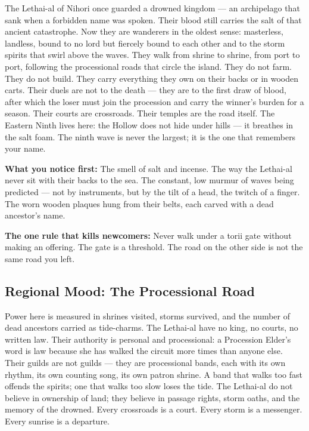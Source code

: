 \vspace{2mm}
\begin{tcolorbox}[colback=black!3,colframe=blue!60!black,title={Theme \& Atmosphere},breakable]
The Lethai-al of Nihori once guarded a drowned kingdom --- an archipelago that sank when a forbidden name was spoken. Their blood still carries the salt of that ancient catastrophe. Now they are wanderers in the oldest sense: masterless, landless, bound to no lord but fiercely bound to each other and to the storm spirits that swirl above the waves. They walk from shrine to shrine, from port to port, following the processional roads that circle the island. They do not farm. They do not build. They carry everything they own on their backs or in wooden carts. Their duels are not to the death --- they are to the first draw of blood, after which the loser must join the procession and carry the winner's burden for a season. Their courts are crossroads. Their temples are the road itself. The Eastern Ninth lives here: the Hollow does not hide under hills --- it breathes in the salt foam. The ninth wave is never the largest; it is the one that remembers your name.

\vspace{2mm}
\textbf{What you notice first:} The smell of salt and incense. The way the Lethai-al never sit with their backs to the sea. The constant, low murmur of waves being predicted --- not by instruments, but by the tilt of a head, the twitch of a finger. The worn wooden plaques hung from their belts, each carved with a dead ancestor's name.

\textbf{The one rule that kills newcomers:} Never walk under a torii gate without making an offering. The gate is a threshold. The road on the other side is not the same road you left.
\end{tcolorbox}

\subsection*{Regional Mood: The Processional Road}

Power here is measured in shrines visited, storms survived, and the number of dead ancestors carried as tide-charms. The Lethai-al have no king, no courts, no written law. Their authority is personal and processional: a Procession Elder's word is law because she has walked the circuit more times than anyone else. Their guilds are not guilds --- they are processional bands, each with its own rhythm, its own counting song, its own patron shrine. A band that walks too fast offends the spirits; one that walks too slow loses the tide. The Lethai-al do not believe in ownership of land; they believe in passage rights, storm oaths, and the memory of the drowned. Every crossroads is a court. Every storm is a messenger. Every sunrise is a departure.

